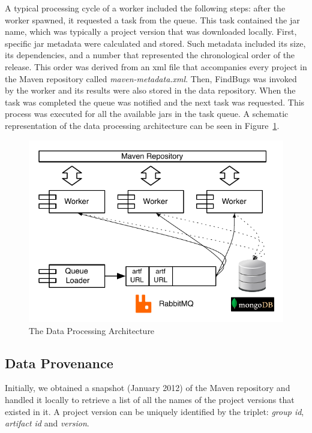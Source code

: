 \documentclass[letterpaper,twocolumn,10pt]{article}
\begin{document}
A typical processing cycle of a worker included the following steps: after
the worker spawned, it requested a task from the queue. This task contained
the {\sc jar} name, which was typically a project version that was downloaded locally.
First, specific {\sc jar} metadata were calculated and stored. Such metadata included
its size, its dependencies, and a number that represented the chronological order of the
release. This order was derived from an {\sc xml} file that
accompanies every project in the Maven repository called {\it
maven-metadata.xml}. Then, FindBugs was invoked by the worker and its results were
also stored in the data repository. When the task was completed the queue
was notified and the next task was requested. This process was executed for
all the available {\sc jar}s in the task queue. A schematic representation of
the data processing architecture can be seen in Figure~\ref{fig:arch}.

\begin{figure}[t]
  \begin{center}
    \includegraphics[scale=0.73]{figures/arch.pdf}
  \end{center}
  \caption{The Data Processing Architecture}
  \label{fig:arch}
\end{figure}

\subsection{Data Provenance}
\label{sec:data}

Initially, we obtained a snapshot (January 2012) of the Maven repository and
handled it locally to retrieve a list of all the names of the project versions
that existed in it. A project version can be uniquely identified by the triplet:
{\it group id}, {\it artifact id} and {\it version}.
\end{document}
